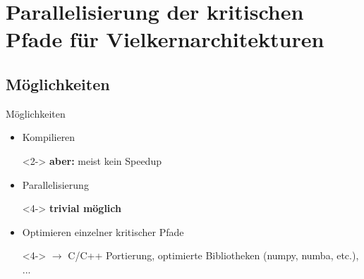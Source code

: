 \section{Parallelisierung der kritischen Pfade für Vielkernarchitekturen}

\subsection{Möglichkeiten}
\begin{frame}{Möglichkeiten}
	\begin{itemize}
		\item Kompilieren
		\begin{uncoverenv}<2->
			\textbf{aber:} meist kein Speedup
		\end{uncoverenv}
		\item<3-> Parallelisierung
		\begin{uncoverenv}<4->
			\textbf{trivial möglich}
		\end{uncoverenv}
		\item<5-> Optimieren einzelner kritischer Pfade\\
		\begin{uncoverenv}<4->
			$\rightarrow$ C/C++ Portierung, optimierte Bibliotheken (numpy, numba, etc.), ...
		\end{uncoverenv}
	\end{itemize}
\end{frame}